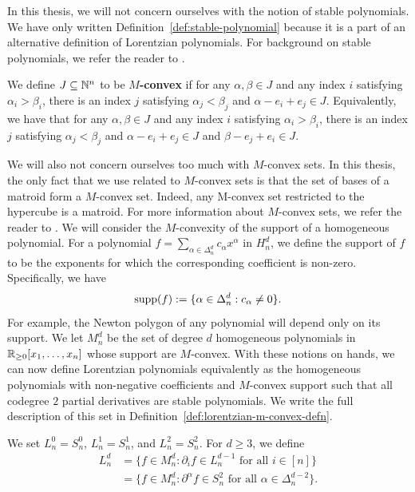 \documentclass{puthesis-UG}
\begin{document}
In this thesis, we will not concern ourselves with the notion of stable polynomials. We have only written Definition~\ref{def:stable-polynomial} because it is a part of an alternative definition of Lorentzian polynomials. For background on stable polynomials, we refer the reader to \cite{wagner2009multivariate}. 

\begin{defn}
	We define $J \subseteq \mathbb{N}^n$ to be \textbf{$M$-convex} if for any $\alpha, \beta \in J$ and any index $i$ satisfying $\alpha_i > \beta_i$, there is an index $j$ satisfying $\alpha_j < \beta_j$ and $\alpha - e_i + e_j \in J$. Equivalently, we have that for any $\alpha, \beta \in J$ and any index $i$ satisfying $\alpha_i > \beta_i$, there is an index $j$ satisfying $\alpha_j < \beta_j$ and $\alpha - e_i + e_j \in J$ and $\beta - e_j + e_i \in J$. 
\end{defn}

We will also not concern ourselves too much with $M$-convex sets. In this thesis, the only fact that we use related to $M$-convex sets is that the set of bases of a matroid form a $M$-convex set. Indeed, any M-convex set restricted to the hypercube is a matroid. For more information about $M$-convex sets, we refer the reader to \cite{discete-convex-analysis}. We will consider the $M$-convexity of the support of a homogeneous polynomial. For a polynomial $f = \sum_{\alpha \in \Delta_n^d} c_\alpha x^\alpha$ in $H_n^d$, we define the support of $f$ to be the exponents for which the corresponding coefficient is non-zero. Specifically, we have
\[
	\operatorname{supp} (f) := \{\alpha \in \Delta_n^d : c_\alpha \neq 0\}.
\]
For example, the Newton polygon of any polynomial will depend only on its support. We let $M_n^d$ be the set of degree $d$ homogeneous polynomials in $\mathbb{R}_{\geq 0} [x_1, \ldots, x_n]$ whose support are $M$-convex. With these notions on hands, we can now define Lorentzian polynomials equivalently as the homogeneous polynomials with non-negative coefficients and $M$-convex support such that all codegree $2$ partial derivatives are stable polynomials. We write the full description of this set in Definition~\ref{def:lorentzian-m-convex-defn}. 


\begin{defn} \label{def:lorentzian-m-convex-defn}
	We set $L_n^0 = S_n^0$, $L_n^1 = S_n^1$, and $L_n^2 = S_n^2$. For $d \geq 3$, we define 
	\begin{align*}
		L_n^d & = \{f \in M_n^d : \partial_i f \in L_n^{d-1} \text{ for all } i \in [n]\} \\
		& = \{f \in M_n^d : \partial^\alpha f \in S_n^2 \text{ for all } \alpha \in \Delta_n^{d-2}\}.
	\end{align*}
\end{defn}
\end{document}
